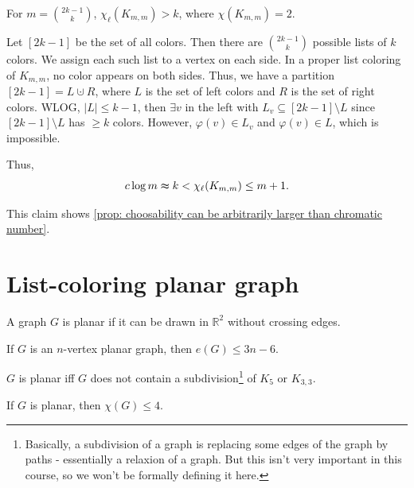 \begin{claim}
    For \(m = \binom{2k - 1}{k}\), \(\chi _\ell (K_{m, m}) > k\), where \(\chi (K_{m, m})= 2\).   
\end{claim}

\begin{explanation}
    Let \([2k - 1]\) be the set of all colors. Then there are \(\binom{2k - 1}{k}\) possible lists of \(k\) colors. We assign each such list to a vertex on each side. In a proper list coloring of \(K_{m, m}\), no color appears on both sides. Thus, we have a partition \([2k - 1] = L \cupdot R\), where \(L\) is the set of left colors and \(R\) is the set of right colors. WLOG, \(\vert L \vert \le k - 1\), then \(\exists v\) in the left with \(L_v \subseteq [2k - 1] \setminus L\) since \([2k - 1] \setminus L\) has \(\ge k\) colors. However, \(\varphi (v) \in L_v\) and \(\varphi (v) \in L\), which is impossible. 

    Thus, 
    \[
        c \log m \thickapprox k < \chi _\ell (K_{m, m}) \le m + 1.
    \]            
\end{explanation}

This claim shows \autoref{prop: choosability can be arbitrarily larger than chromatic number}. 

\section{List-coloring planar graph}
\begin{definition}
    A graph \(G\) is planar if it can be drawn in \(\mathbb{R} ^2\) without crossing edges. 
\end{definition}

\begin{theorem}[Euler]
    If \(G\) is an \(n\)-vertex planar graph, then \(e(G) \le 3n - 6\).   
\end{theorem}

\begin{theorem}[Kuratowski]
    \(G\) is planar iff \(G\) does not contain a subdivision\footnote{Basically, a subdivision of a graph is replacing some edges of the graph by paths - essentially a relaxion of a graph. But this isn't very important in this course, so we won't be formally defining it here.} of \(K_5\) or \(K_{3, 3}\).    
\end{theorem}

\begin{theorem}
    If \(G\) is planar, then \(\chi (G) \le 4\).  
\end{theorem}

